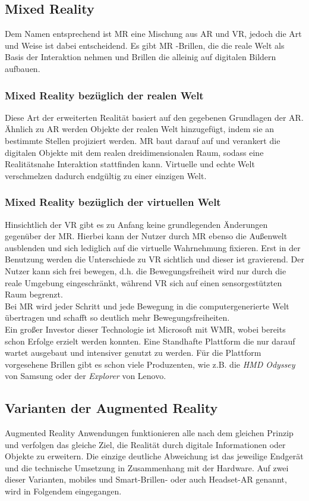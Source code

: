 \subsection*{Mixed Reality}
Dem Namen entsprechend ist \ac{MR} eine Mischung aus \acl{AR} und \acl{VR}, jedoch die Art und Weise ist dabei entscheidend. Es gibt \acs{MR}
-Brillen, die die reale Welt als Basis der Interaktion nehmen und Brillen die alleinig auf digitalen Bildern aufbauen. \cite{mr.2018o}
\subsubsection*{Mixed Reality bezüglich der realen Welt}
Diese Art der erweiterten Realität basiert auf den gegebenen Grundlagen der \acs{AR}. Ähnlich zu \acl{AR} werden Objekte der realen Welt 
hinzugefügt, indem sie an bestimmte Stellen projiziert werden. \acl{MR} baut darauf auf und verankert die digitalen Objekte mit dem realen
dreidimensionalen Raum, sodass eine Realitätsnahe Interaktion stattfinden kann. Virtuelle und echte Welt verschmelzen dadurch endgültig zu 
einer einzigen Welt. 
\subsubsection*{Mixed Reality bezüglich der virtuellen Welt}
Hinsichtlich der \acs{VR} gibt es zu Anfang keine grundlegenden Änderungen gegenüber der \acs{MR}. Hierbei kann der Nutzer durch 
\acs{MR} ebenso die Außenwelt ausblenden und sich lediglich auf die virtuelle Wahrnehmung fixieren. Erst in der Benutzung werden die Unterschiede 
zu \acs{VR} sichtlich und dieser ist gravierend. Der Nutzer kann sich frei bewegen, d.h. die Bewegungsfreiheit wird nur durch die reale Umgebung 
eingeschränkt, während \acl{VR} sich auf einen sensorgestützten Raum begrenzt. \cite{vr.2018n}
\\ 
Bei \acs{MR} wird jeder Schritt und jede Bewegung in die computergenerierte Welt übertragen und schafft so deutlich mehr Bewegungsfreiheiten.
\\ 
\linebreak 
Ein großer Investor dieser Technologie ist Microsoft mit \ac{WMR}, wobei bereits schon Erfolge erzielt werden konnten. Eine Standhafte Plattform 
die nur darauf wartet ausgebaut und intensiver genutzt zu werden. Für die Plattform vorgesehene Brillen gibt es schon viele Produzenten, wie z.B. 
die \textit{HMD Odyssey} von Samsung oder der \textit{Explorer} von Lenovo.


\subsection{Varianten der Augmented Reality}
\label{subchap:Varianten der AR}
Augmented Reality Anwendungen funktionieren alle nach dem gleichen Prinzip und verfolgen das gleiche Ziel, die Realität durch digitale Informationen 
oder Objekte zu erweitern. Die einzige deutliche Abweichung ist das jeweilige Endgerät und die technische Umsetzung in Zusammenhang mit der 
Hardware. Auf zwei dieser Varianten, mobiles und Smart-Brillen- oder auch Headset-AR genannt, wird in Folgendem eingegangen.

